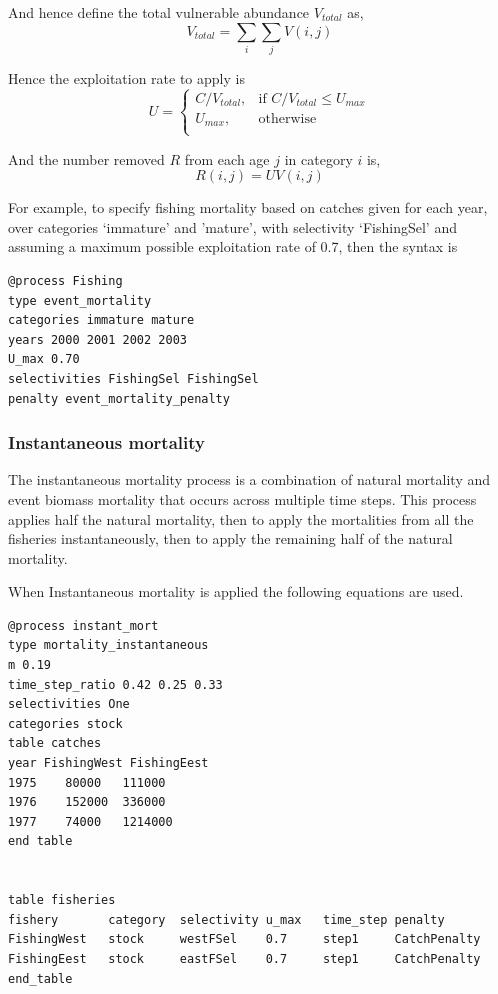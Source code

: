And hence define the total vulnerable abundance $V_{total}$ as,
\begin{equation}
  V_{total}  = \sum\limits_i {\sum\limits_j {V(i,j)}} 
\end{equation}

Hence the exploitation rate to apply is 
\begin{equation}
U = \begin{cases}
  C/V_{total}, & \text{if $C/V_{total} \leq U_{max}$} \\
  U_{max}, & \text{otherwise}\\ 
  \end{cases} 
\end{equation}

And the number removed $R$ from each age $j$ in category $i$ is,
\begin{equation}
  R(i,j) = UV(i,j)
\end{equation}

For example, to specify fishing mortality based on catches given for each year, over categories `immature' and 'mature', with selectivity `FishingSel' and assuming a maximum possible exploitation rate of 0.7, then the syntax is

{\small{\begin{verbatim}
@process Fishing
type event_mortality
categories immature mature
years 2000 2001 2002 2003
U_max 0.70
selectivities FishingSel FishingSel
penalty event_mortality_penalty
\end{verbatim}}}

\subsubsection*{Instantaneous mortality}
The instantaneous mortality process is a combination of natural mortality and event biomass mortality that occurs across multiple time steps. This process applies half the natural mortality, then to apply the mortalities from all the fisheries instantaneously, then to apply the remaining half of the natural mortality. 

When Instantaneous mortality is applied the following equations are used.\\
{\small{\begin{verbatim}
@process instant_mort
type mortality_instantaneous
m 0.19
time_step_ratio 0.42 0.25 0.33
selectivities One
categories stock
table catches
year FishingWest FishingEest
1975	80000	111000
1976	152000	336000
1977	74000	1214000
end table


table fisheries
fishery       category  selectivity u_max   time_step penalty
FishingWest   stock     westFSel    0.7     step1     CatchPenalty
FishingEest   stock     eastFSel    0.7     step1     CatchPenalty
end_table
\end{verbatim}}}

